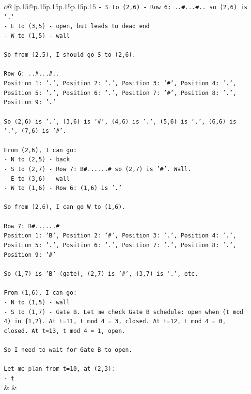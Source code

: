 \documentclass{article}
\begin{document}
{\begin{supertabular}{c@{$\;$}|p{.15\linewidth}@{}p{.15\linewidth}p{.15\linewidth}p{.15\linewidth}p{.15\linewidth}p{.15\linewidth}}
{{{\texttt{{-} S to (2,6) {-} Row 6: ..\#...\#.. so (2,6) is '.'} \\
\texttt{{-} E to (3,5) {-} open, but leads to dead end} \\
\texttt{{-} W to (1,5) {-} wall} \\
\\ 
\texttt{So from (2,5), I should go S to (2,6).} \\
\\ 
\texttt{Row 6: ..\#...\#..} \\
\texttt{Position 1: '.', Position 2: '.', Position 3: '\#', Position 4: '.', Position 5: '.', Position 6: '.', Position 7: '\#', Position 8: '.', Position 9: '.'} \\
\\ 
\texttt{So (2,6) is '.', (3,6) is '\#', (4,6) is '.', (5,6) is '.', (6,6) is '.', (7,6) is '\#'.} \\
\\ 
\texttt{From (2,6), I can go:} \\
\texttt{{-} N to (2,5) {-} back} \\
\texttt{{-} S to (2,7) {-} Row 7: B\#......\# so (2,7) is '\#'. Wall.} \\
\texttt{{-} E to (3,6) {-} wall} \\
\texttt{{-} W to (1,6) {-} Row 6: (1,6) is '.'} \\
\\ 
\texttt{So from (2,6), I can go W to (1,6).} \\
\\ 
\texttt{Row 7: B\#......\#} \\
\texttt{Position 1: 'B', Position 2: '\#', Position 3: '.', Position 4: '.', Position 5: '.', Position 6: '.', Position 7: '.', Position 8: '.', Position 9: '\#'} \\
\\ 
\texttt{So (1,7) is 'B' (gate), (2,7) is '\#', (3,7) is '.', etc.} \\
\\ 
\texttt{From (1,6), I can go:} \\
\texttt{{-} N to (1,5) {-} wall} \\
\texttt{{-} S to (1,7) {-} Gate B. Let me check Gate B schedule: open when (t mod 4) in \{1,2\}. At t=11, t mod 4 = 3, closed. At t=12, t mod 4 = 0, closed. At t=13, t mod 4 = 1, open.} \\
\\ 
\texttt{So I need to wait for Gate B to open.} \\
\\ 
\texttt{Let me plan from t=10, at (2,3):} \\
\texttt{{-} t} \\
            }
        }
    }
    & & \\ \\


\end{supertabular}}
\end{document}
